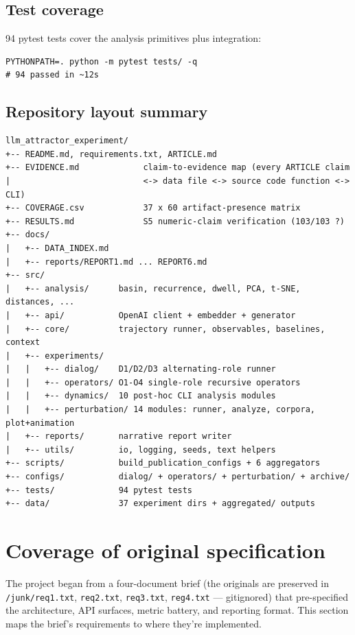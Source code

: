 \documentclass{article}
\theoremstyle{plain}
\theoremstyle{definition}
\begin{document}
\subsection{Test coverage}

94 pytest tests cover the analysis primitives plus integration:

\begin{verbatim}
PYTHONPATH=. python -m pytest tests/ -q
# 94 passed in ~12s
\end{verbatim}

\subsection{Repository layout summary}

\begin{verbatim}
llm_attractor_experiment/
+-- README.md, requirements.txt, ARTICLE.md
+-- EVIDENCE.md             claim-to-evidence map (every ARTICLE claim
|                           <-> data file <-> source code function <-> CLI)
+-- COVERAGE.csv            37 x 60 artifact-presence matrix
+-- RESULTS.md              S5 numeric-claim verification (103/103 ?)
+-- docs/
|   +-- DATA_INDEX.md
|   +-- reports/REPORT1.md ... REPORT6.md
+-- src/
|   +-- analysis/      basin, recurrence, dwell, PCA, t-SNE, distances, ...
|   +-- api/           OpenAI client + embedder + generator
|   +-- core/          trajectory runner, observables, baselines, context
|   +-- experiments/
|   |   +-- dialog/    D1/D2/D3 alternating-role runner
|   |   +-- operators/ O1-O4 single-role recursive operators
|   |   +-- dynamics/  10 post-hoc CLI analysis modules
|   |   +-- perturbation/ 14 modules: runner, analyze, corpora, plot+animation
|   +-- reports/       narrative report writer
|   +-- utils/         io, logging, seeds, text helpers
+-- scripts/           build_publication_configs + 6 aggregators
+-- configs/           dialog/ + operators/ + perturbation/ + archive/
+-- tests/             94 pytest tests
+-- data/              37 experiment dirs + aggregated/ outputs
\end{verbatim}


\section{Coverage of original specification}

The project began from a four-document brief (the originals are
preserved in \texttt{/junk/req1.txt}, \texttt{req2.txt}, \texttt{req3.txt}, \texttt{reg4.txt} —
gitignored) that pre-specified the architecture, API surfaces, metric
battery, and reporting format. This section maps the brief's
requirements to where they're implemented.
\end{document}
